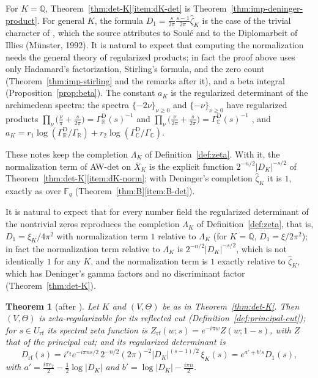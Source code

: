\documentclass[11pt]{amsart}
\theoremstyle{plain}
\newtheorem{theorem}{Theorem}[section]
\theoremstyle{definition}
\theoremstyle{remark}
\numberwithin{equation}{section}
\newcommand{\C}{\mathbb{C}}
\newcommand{\R}{\mathbb{R}}
\newcommand{\Q}{\mathbb{Q}}
\newcommand{\F}{\mathbb{F}}
\newcommand{\Xbar}{\overline{X}}
\newcommand{\GR}{\Gamma_{\mathbb{R}}}
\newcommand{\GC}{\Gamma_{\mathbb{C}}}
\begin{document}
For $K=\Q$, Theorem~\ref{thm:det-K}\ref{item:dK-det} is
Theorem~\ref{thm:imp-deninger-product}. For general $K$, the formula
$D_1=\frac s{2\pi}\frac{s-1}{2\pi}\widehat\zeta_K$ is the case of the
trivial character of \cite[Theorem~7.18(ii), p.~35]{Deninger1994Motivic},
which the source attributes to Soul\'e and to the Diplomarbeit of
Illies (M\"unster, 1992). It is
natural to expect that computing the normalization needs the general
theory of regularized products; in fact the proof above uses only
Hadamard's factorization, Stirling's formula, and the zero count
(Theorem~\ref{thm:imp-stirling} and the remarks after it), and a beta
integral (Proposition~\ref{prop:beta}). The
constant $a_K$ is the regularized determinant of the archimedean
spectra: the spectra $\{-2\nu\}_{\nu\ge0}$ and $\{-\nu\}_{\nu\ge0}$ have
regularized products $\prod_\nu\bigl(\frac\nu\pi+\frac s{2\pi}\bigr)=
\Gamma^{\mathrm D}_{\R}(s)^{-1}$ and
$\prod_\nu\bigl(\frac\nu{2\pi}+\frac s{2\pi}\bigr)=
\Gamma^{\mathrm D}_{\C}(s)^{-1}$
\cite[Proposition~2.1, p.~248]{Deninger1991Gamma}, and
$a_K=r_1\log(\Gamma^{\mathrm D}_{\R}/\GR)+r_2\log(\Gamma^{\mathrm D}_{\C}
/\GC)$.

These notes keep the completion $\Lambda_K$ of
Definition~\ref{def:zeta}. With it, the normalization term of AW-det on
$\Xbar_K$ is the explicit function $2^{-n/2}|D_K|^{-s/2}$ of
Theorem~\ref{thm:det-K}\ref{item:dK-norm}; with Deninger's completion
$\widehat\zeta_K$ it is $1$, exactly as over $\F_q$
(Theorem~\ref{thm:B}\ref{item:B-det}).

It is natural to expect that for every number field the regularized
determinant of the nontrivial zeros reproduces the completion
$\Lambda_K$ of Definition~\ref{def:zeta}, that is,
$D_1=\xi_K/4\pi^2$ with normalization term $1$ relative to $\Lambda_K$
(for $K=\Q$, $D_1=\xi/2\pi^2$); in fact the normalization term relative
to $\Lambda_K$ is $2^{-n/2}|D_K|^{-s/2}$, which is not identically $1$
for any $K$, and the normalization term is $1$ exactly relative to
$\widehat\zeta_K$, which has Deninger's gamma factors and no
discriminant factor (Theorem~\ref{thm:det-K}).

\begin{theorem}[{after \cite[Lemma~(1.7), p.~6, and (7.19.1),
p.~36]{Deninger1994Motivic}}]\label{thm:det-K-rf}
Let $K$ and $(V,\Theta)$ be as in Theorem~\ref{thm:det-K}. Then
$(V,\Theta)$ is zeta-regularizable for its reflected cut
(Definition~\ref{def:principal-cut}); for $s\in U_{\mathrm{rf}}$ its
spectral zeta function is $Z_{\mathrm{rf}}(w;s)=e^{-i\pi w}Z(w;1-s)$,
with $Z$ that of the principal cut; and its regularized determinant is
\[
D_{\mathrm{rf}}(s)=i^{r_2}e^{-i\pi ns/2}\,2^{-n/2}(2\pi)^{-2}
|D_K|^{(s-1)/2}\,\xi_K(s)
=e^{a'+b's}D_1(s),
\]
with $a'=\tfrac{i\pi r_2}2-\tfrac12\log|D_K|$ and
$b'=\log|D_K|-\tfrac{i\pi n}2$.
\end{theorem}
\end{document}
